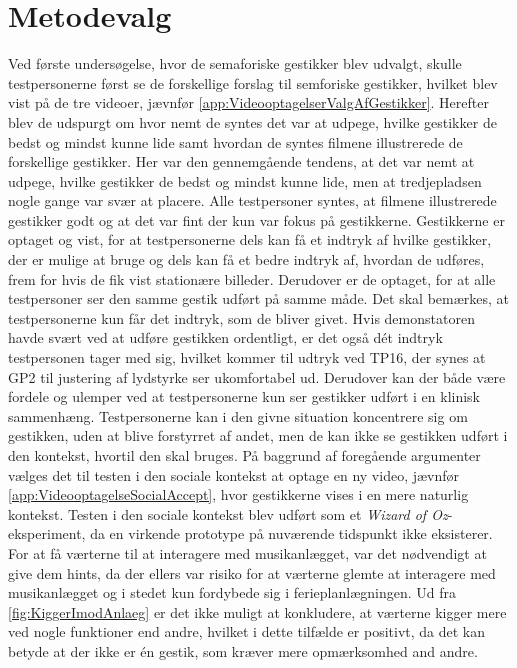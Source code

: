 \section{Metodevalg}
\label{DiskussionMetodevalg}
%
Ved første undersøgelse, hvor de semaforiske gestikker blev udvalgt, skulle testpersonerne først se de forskellige forslag til semforiske gestikker, hvilket blev vist på de tre videoer, jævnfør \autoref{app:VideooptagelserValgAfGestikker}. Herefter blev de udspurgt om hvor nemt de syntes det var at udpege, hvilke gestikker de bedst og mindst kunne lide samt hvordan de syntes filmene illustrerede de forskellige gestikker. Her var den gennemgående tendens, at det var nemt at udpege, hvilke gestikker de bedst og mindst kunne lide, men at tredjepladsen nogle gange var svær at placere. Alle testpersoner syntes, at filmene illustrerede gestikker godt og at det var fint der kun var fokus på gestikkerne. Gestikkerne er optaget og vist, for at testpersonerne dels kan få et indtryk af hvilke gestikker, der er mulige at bruge og dels kan få et bedre indtryk af, hvordan de udføres, frem for hvis de fik vist stationære billeder. Derudover er de optaget, for at alle testpersoner ser den samme gestik udført på samme måde. Det skal bemærkes, at testpersonerne kun får det indtryk, som de bliver givet. Hvis demonstatoren havde svært ved at udføre gestikken ordentligt, er det også dét indtryk testpersonen tager med sig, hvilket kommer til udtryk ved TP16, der synes at GP2 til justering af lydstyrke ser ukomfortabel ud. Derudover kan der både være fordele og ulemper ved at testpersonerne kun ser gestikker udført i en klinisk sammenhæng. Testpersonerne kan i den givne situation koncentrere sig om gestikken, uden at blive forstyrret af andet, men de kan ikke se gestikken udført i den kontekst, hvortil den skal bruges. På baggrund af foregående argumenter vælges det til testen i den sociale kontekst at optage en ny video, jævnfør \autoref{app:VideooptagelseSocialAccept}, hvor gestikkerne vises i en mere naturlig kontekst.\blankline 
%
Testen i den sociale kontekst blev udført som et \textit{Wizard of Oz}-eksperiment, da en virkende prototype på nuværende tidspunkt ikke eksisterer. For at få værterne til at interagere med musikanlægget, var det nødvendigt at give dem hints, da der ellers var risiko for at værterne glemte at interagere med musikanlægget og i stedet kun fordybede sig i ferieplanlægningen. Ud fra \autoref{fig:KiggerImodAnlaeg} er det ikke muligt at konkludere, at værterne kigger mere ved nogle funktioner end andre, hvilket i dette tilfælde er positivt, da det kan betyde at der ikke er én gestik, som kræver mere opmærksomhed and andre. 

